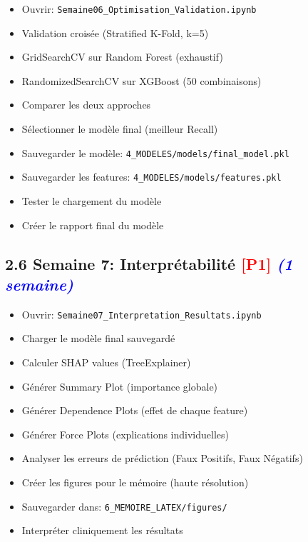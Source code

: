 \documentclass[a4paper,11pt]{article}
\newcommand{\checkbox}{\large$\square$}
\newcommand{\priorite}[1]{\textcolor{red}{\textbf{[#1]}}}
\newcommand{\duree}[1]{\textcolor{blue}{\textit{(#1)}}}
\begin{document}
\begin{itemize}[label=\checkbox]
    \item Ouvrir: \texttt{Semaine06\_Optimisation\_Validation.ipynb}
    \item Validation croisée (Stratified K-Fold, k=5)
    \item GridSearchCV sur Random Forest (exhaustif)
    \item RandomizedSearchCV sur XGBoost (50 combinaisons)
    \item Comparer les deux approches
    \item Sélectionner le modèle final (meilleur Recall)
    \item Sauvegarder le modèle: \texttt{4\_MODELES/models/final\_model.pkl}
    \item Sauvegarder les features: \texttt{4\_MODELES/models/features.pkl}
    \item Tester le chargement du modèle
    \item Créer le rapport final du modèle
\end{itemize}

\subsection*{2.6 Semaine 7: Interprétabilité \priorite{P1} \duree{1 semaine}}

\begin{itemize}[label=\checkbox]
    \item Ouvrir: \texttt{Semaine07\_Interpretation\_Resultats.ipynb}
    \item Charger le modèle final sauvegardé
    \item Calculer SHAP values (TreeExplainer)
    \item Générer Summary Plot (importance globale)
    \item Générer Dependence Plots (effet de chaque feature)
    \item Générer Force Plots (explications individuelles)
    \item Analyser les erreurs de prédiction (Faux Positifs, Faux Négatifs)
    \item Créer les figures pour le mémoire (haute résolution)
    \item Sauvegarder dans: \texttt{6\_MEMOIRE\_LATEX/figures/}
    \item Interpréter cliniquement les résultats
\end{itemize}

\newpage
\end{document}
